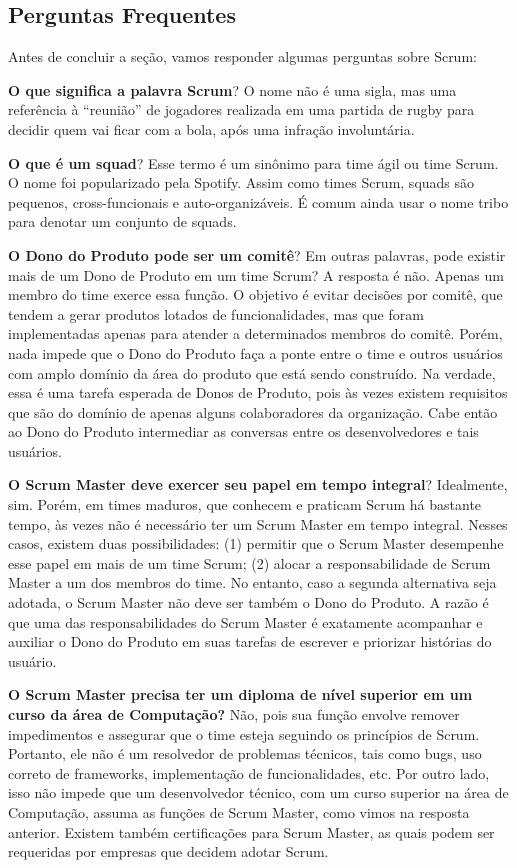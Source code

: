 \documentclass[
  11pt,
  twoside]{book}
\begin{document}
\hypertarget{perguntas-frequentes-1}{%
\subsection{Perguntas Frequentes}\label{perguntas-frequentes-1}}

Antes de concluir a seção, vamos responder algumas perguntas sobre
Scrum:

\textbf{O que significa a palavra Scrum}? O nome não é uma sigla, mas
uma referência à ``reunião'' de jogadores realizada em uma partida de
rugby para decidir quem vai ficar com a bola, após uma infração
involuntária.

 \textbf{O que é um squad}? Esse termo é um sinônimo para
time ágil ou time Scrum. O nome foi popularizado pela Spotify. Assim
como times Scrum, squads são pequenos, cross-funcionais e
auto-organizáveis. É comum ainda usar o nome tribo para denotar um
conjunto de squads.

\textbf{O Dono do Produto pode ser um comitê}? Em outras palavras, pode
existir mais de um Dono de Produto em um time Scrum? A resposta é não.
Apenas um membro do time exerce essa função. O objetivo é evitar
decisões por comitê, que tendem a gerar produtos lotados de
funcionalidades, mas que foram implementadas apenas para atender a
determinados membros do comitê. Porém, nada impede que o Dono do Produto
faça a ponte entre o time e outros usuários com amplo domínio da área do
produto que está sendo construído. Na verdade, essa é uma tarefa
esperada de Donos de Produto, pois às vezes existem requisitos que são
do domínio de apenas alguns colaboradores da organização. Cabe então ao
Dono do Produto intermediar as conversas entre os desenvolvedores e tais
usuários.

 \textbf{O Scrum Master deve exercer seu papel
em tempo integral}? Idealmente, sim. Porém, em times maduros, que
conhecem e praticam Scrum há bastante tempo, às vezes não é necessário
ter um Scrum Master em tempo integral. Nesses casos, existem duas
possibilidades: (1) permitir que o Scrum Master desempenhe esse papel em
mais de um time Scrum; (2) alocar a responsabilidade de Scrum Master a
um dos membros do time. No entanto, caso a segunda alternativa seja
adotada, o Scrum Master não deve ser também o Dono do Produto. A razão é
que uma das responsabilidades do Scrum Master é exatamente acompanhar e
auxiliar o Dono do Produto em suas tarefas de escrever e priorizar
histórias do usuário.

\textbf{O Scrum Master precisa ter um diploma de nível superior em um
curso da área de Computação?} Não, pois sua função envolve remover
impedimentos e assegurar que o time esteja seguindo os princípios de
Scrum. Portanto, ele não é um resolvedor de problemas técnicos, tais
como bugs, uso correto de frameworks, implementação de funcionalidades,
etc. Por outro lado, isso não impede que um desenvolvedor técnico, com
um curso superior na área de Computação, assuma as funções de Scrum
Master, como vimos na resposta anterior. Existem também certificações
para Scrum Master, as quais podem ser requeridas por empresas que
decidem adotar Scrum.
\end{document}
